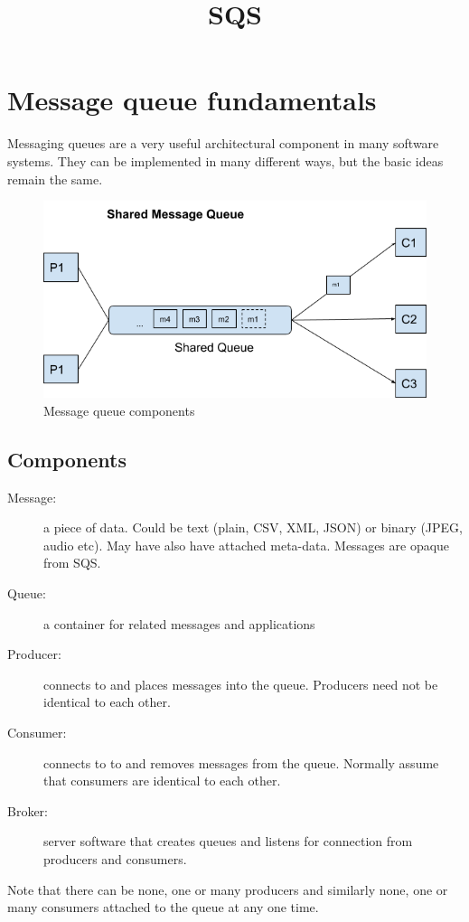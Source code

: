 \documentclass{pgnotes}
\title{SQS}
\begin{document}
\maketitle

\section{Message queue fundamentals}\label{message-queue-fundamentals}

Messaging queues are a very useful architectural component in many
software systems. They can be implemented in many different ways, but
the basic ideas remain the same.

\begin{figure}
\centering
\includegraphics[width=0.6\linewidth]{shared_message_queue}
\caption{Message queue components}
\end{figure}

\subsection{Components}\label{components}

\begin{description}
\item[Message:]
a piece of data. Could be text (plain, CSV, XML, JSON) or binary (JPEG,
audio etc). May have also have attached meta-data. Messages are opaque
from SQS.
\item[Queue:]
a container for related messages and applications
\item[Producer:]
connects to and places messages into the queue. Producers need not be
identical to each other.
\item[Consumer:]
connects to to and removes messages from the queue. Normally assume that
consumers are identical to each other.
\item[Broker:]
server software that creates queues and listens for connection from
producers and consumers.
\end{description}

Note that there can be none, one or many producers and similarly none,
one or many consumers attached to the queue at any one time.
\end{document}
